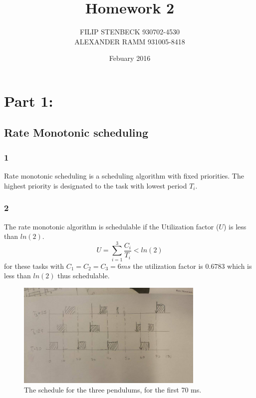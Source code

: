 \documentclass[10pt,a4paper]{article}
\author{FILIP STENBECK	930702-4530 \\ ALEXANDER RAMM 931005-8418}
\date{Febuary 2016}
\title{Homework 2}
\begin{document}
\maketitle
\clearpage
\section*{Part 1:}
\subsection*{Rate Monotonic scheduling}
\subsubsection*{1}
Rate monotonic scheduling is a scheduling algorithm with fixed priorities. The highest priority is designated to the task with lowest period $T_i$. 
\subsubsection*{2}
The rate monotonic algorithm is schedulable if the Utilization factor ($U$) is less than $ln(2)$.
\begin{equation*}
U=\sum_{
   i=1
  }^{3}
 \frac{C_i}{T_i}<ln(2)
\end{equation*}
for these tasks with $C_1=C_2=C_3=6 ms$ the utilization factor is $0.6783$ which is less than $ln(2)$ thus schedulable.
\begin{figure}[!h]
  \centering
    \includegraphics[width=0.8\textwidth]{egen.jpg}
      \caption{The schedule for the three pendulums, for the first 70 ms.}
\end{figure}
\end{document}
